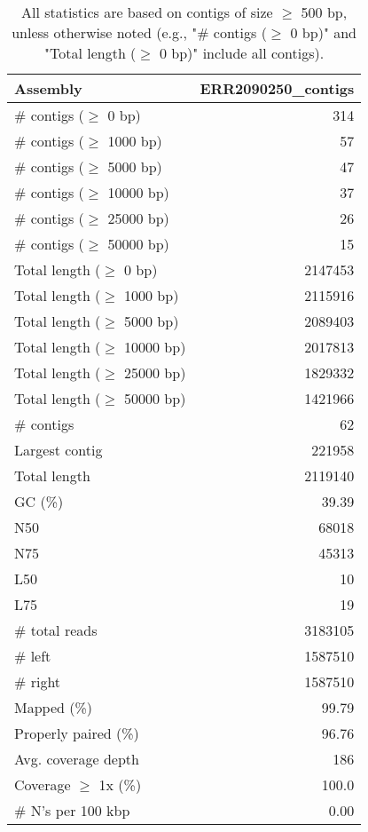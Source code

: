 \documentclass[12pt,a4paper]{article}
\begin{document}
\begin{table}[ht]
\begin{center}
\caption{All statistics are based on contigs of size $\geq$ 500 bp, unless otherwise noted (e.g., "\# contigs ($\geq$ 0 bp)" and "Total length ($\geq$ 0 bp)" include all contigs).}
\begin{tabular}{|l*{1}{|r}|}
\hline
Assembly & ERR2090250\_contigs \\ \hline
\# contigs ($\geq$ 0 bp) & 314 \\ \hline
\# contigs ($\geq$ 1000 bp) & 57 \\ \hline
\# contigs ($\geq$ 5000 bp) & 47 \\ \hline
\# contigs ($\geq$ 10000 bp) & 37 \\ \hline
\# contigs ($\geq$ 25000 bp) & 26 \\ \hline
\# contigs ($\geq$ 50000 bp) & 15 \\ \hline
Total length ($\geq$ 0 bp) & 2147453 \\ \hline
Total length ($\geq$ 1000 bp) & 2115916 \\ \hline
Total length ($\geq$ 5000 bp) & 2089403 \\ \hline
Total length ($\geq$ 10000 bp) & 2017813 \\ \hline
Total length ($\geq$ 25000 bp) & 1829332 \\ \hline
Total length ($\geq$ 50000 bp) & 1421966 \\ \hline
\# contigs & 62 \\ \hline
Largest contig & 221958 \\ \hline
Total length & 2119140 \\ \hline
GC (\%) & 39.39 \\ \hline
N50 & 68018 \\ \hline
N75 & 45313 \\ \hline
L50 & 10 \\ \hline
L75 & 19 \\ \hline
\# total reads & 3183105 \\ \hline
\# left & 1587510 \\ \hline
\# right & 1587510 \\ \hline
Mapped (\%) & 99.79 \\ \hline
Properly paired (\%) & 96.76 \\ \hline
Avg. coverage depth & 186 \\ \hline
Coverage $\geq$ 1x (\%) & 100.0 \\ \hline
\# N's per 100 kbp & 0.00 \\ \hline
\end{tabular}
\end{center}
\end{table}
\end{document}
